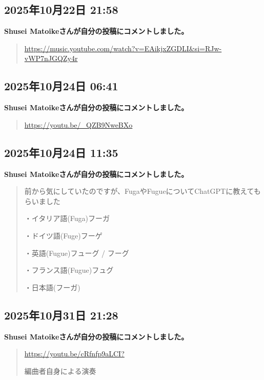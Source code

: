 \subsection*{2025年10月22日 21:58}

\textbf{Shusei Matoikeさんが自分の投稿にコメントしました。}

\begin{quote}
\url{https://music.youtube.com/watch?v=EAikjxZGDLI&si=RJw-vWP7nJGQZy4r}
\end{quote}

\subsection*{2025年10月24日 06:41}

\textbf{Shusei Matoikeさんが自分の投稿にコメントしました。}

\begin{quote}
\url{https://youtu.be/_QZB9NweBXo}
\end{quote}

\subsection*{2025年10月24日 11:35}

\textbf{Shusei Matoikeさんが自分の投稿にコメントしました。}

\begin{quote}
前から気にしていたのですが、FugaやFugueについてChatGPTに教えてもらいました

・イタリア語(Fuga)フーガ

・ドイツ語(Fuge)フーゲ

・英語(Fugue)フューグ / フーグ

・フランス語(Fugue)フュグ

・日本語(フーガ)
\end{quote}

\subsection*{2025年10月31日 21:28}

\textbf{Shusei Matoikeさんが自分の投稿にコメントしました。}

\begin{quote}
\url{https://youtu.be/cRfnfp9aLCI?}

編曲者自身による演奏
\end{quote}

